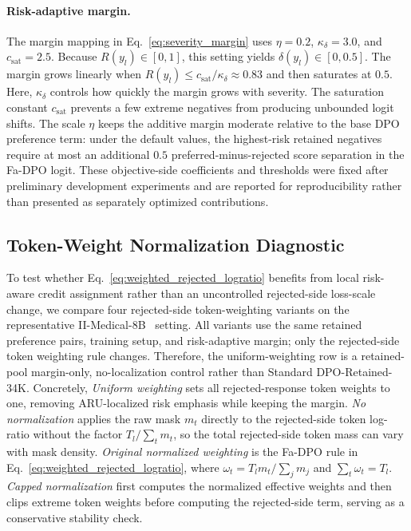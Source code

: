 \documentclass[a4paper,fleqn,doubleblind]{cas-sc}
\begin{document}
\paragraph{Risk-adaptive margin.}
The margin mapping in Eq.~\ref{eq:severity_margin} uses $\eta=0.2$, $\kappa_{\delta}=3.0$, and $c_{\text{sat}}=2.5$.
Because $R(y_l)\in[0,1]$, this setting yields $\delta(y_l)\in[0,0.5]$.
The margin grows linearly when $R(y_l)\le c_{\text{sat}}/\kappa_{\delta} \approx 0.83$ and then saturates at $0.5$.
Here, $\kappa_{\delta}$ controls how quickly the margin grows with severity.
The saturation constant $c_{\text{sat}}$ prevents a few extreme negatives from producing unbounded logit shifts.
The scale $\eta$ keeps the additive margin moderate relative to the base DPO preference term: under the default values, the highest-risk retained negatives require at most an additional $0.5$ preferred-minus-rejected score separation in the Fa-DPO logit.
These objective-side coefficients and thresholds were fixed after preliminary development experiments and are reported for reproducibility rather than presented as separately optimized contributions.

\subsection{Token-Weight Normalization Diagnostic}
\label{app:normalization_stability}

To test whether Eq.~\ref{eq:weighted_rejected_logratio} benefits from local risk-aware credit assignment rather than an uncontrolled rejected-side loss-scale change, we compare four rejected-side token-weighting variants on the representative II-Medical-8B~\cite{intelligentinternet2025iimedical8b} setting. All variants use the same retained preference pairs, training setup, and risk-adaptive margin; only the rejected-side token weighting rule changes. Therefore, the uniform-weighting row is a retained-pool margin-only, no-localization control rather than Standard DPO-Retained-34K.
Concretely, \textit{Uniform weighting} sets all rejected-response token weights to one, removing ARU-localized risk emphasis while keeping the margin. \textit{No normalization} applies the raw mask $m_t$ directly to the rejected-side token log-ratio without the factor $T_l/\sum_t m_t$, so the total rejected-side token mass can vary with mask density. \textit{Original normalized weighting} is the Fa-DPO rule in Eq.~\ref{eq:weighted_rejected_logratio}, where $\omega_t=T_lm_t/\sum_jm_j$ and $\sum_t\omega_t=T_l$. \textit{Capped normalization} first computes the normalized effective weights and then clips extreme token weights before computing the rejected-side term, serving as a conservative stability check.
\end{document}
